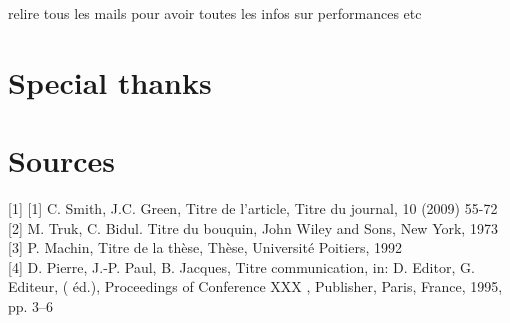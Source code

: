 \documentclass{article}
\begin{document}
relire tous les mails pour avoir toutes les infos sur performances etc

\section*{Special thanks}

\section*{Sources}

\noindent
{[}1]
{[}1] C. Smith, J.C. Green, Titre de l’article, Titre du journal, 10 (2009) 55-72\\
{[}2] M. Truk, C. Bidul. Titre du bouquin, John Wiley and Sons, New York, 1973\\
{[}3] P. Machin, Titre de la thèse, Thèse, Université Poitiers, 1992\\
{[}4] D. Pierre, J.-P. Paul, B. Jacques, Titre communication, in: D. Editor, G. Editeur, ( éd.), Proceedings of Conference XXX , Publisher, Paris, France, 1995, pp. 3–6

\newpage
\end{document}
